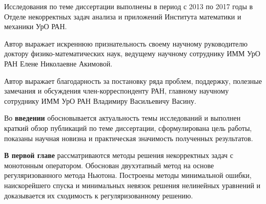 \documentclass[%
autoref,     %
href,        %
facsimile,   %
colorlinks,  %
]{disser}
\begin{document}


\objectivesection
\objectivetext

\methodssection
\methodstext

\noveltysection
\noveltytext

{}


\approbationsection
\approbationtext

\pubsection
\pubtext

\contribsection
\contribtext

\structsection
\structtext

Исследования по теме диссертации выполнены в период с 2013 по 2017 годы в Отделе некорректных задач анализа и приложений Института математики и механики УрО РАН.

Автор выражает искреннюю признательность своему научному руководителю доктору физико-математических наук, ведущему научному сотруднику ИММ УрО РАН Елене Николаевне Акимовой.

Автор выражает благодарность за постановку ряда проблем, поддержку, полезные замечания и обсуждения член-корреспонденту РАН, главному научному сотруднику ИММ УрО РАН Владимиру Васильевичу Васину.


Во \textbf{введении} обосновывается актуальность темы исследований и выполнен краткий обзор публикаций по теме диссертации, сформулирована цель работы, показаны научная новизна и практическая значимость полученных результатов.

\textbf{В первой главе} рассматриваются методы решения некорректных задач с монотонным оператором. Обоснован двухэтапный метод на основе  регуляризованного метода Ньютона. Построены методы минимальной ошибки, наискорейшего спуска и минимальных невязок решения нелинейных уравнений и доказывается их сходимость к регуляризованному решению.
\end{document}

